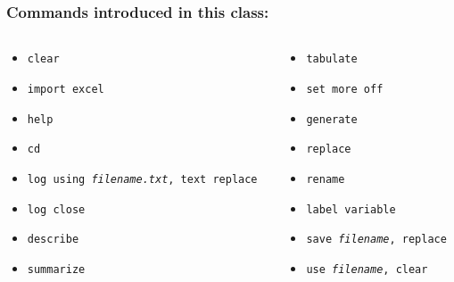 \documentclass[11pt]{beamer}
\begin{document}
\begin{frame}
\frametitle{Commands introduced in this class:}
\begin{columns}
	\begin{column}{0.5\textwidth}
		\begin{itemize}
			\item \texttt{clear}
			\item \texttt{import excel}
			\item \texttt{help}
			\item \texttt{cd}
			\item \texttt{log using \textit{filename.txt}, text replace}
			\item \texttt{log close}
			\item \texttt{describe}
			\item \texttt{summarize}
		\end{itemize}
	\end{column}
	\begin{column}{0.5\textwidth}
		\begin{itemize}
			\item \texttt{tabulate}
			\item \texttt{set more off}
			\item \texttt{generate}
			\item \texttt{replace}
			\item \texttt{rename}
			\item \texttt{label variable}
			\item \texttt{save  \textit{filename}, replace}
			\item \texttt{use \textit{filename}, clear}
		\end{itemize}
	\end{column}
\end{columns}
\end{frame}
\end{document}
